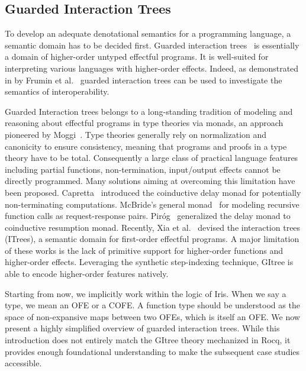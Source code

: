 \documentclass{article}
\theoremstyle{definition}
\theoremstyle{plain}
\theoremstyle{remark}
\begin{document}
\subsection{Guarded Interaction Trees}

To develop an adequate denotational semantics for a programming language, a semantic domain has to be decided first.
Guarded interaction trees~\cite{popl24gitree} is essentially a domain of higher-order untyped effectful programs.
It is well-suited for interpreting various languages with higher-order effects.
Indeed, as demonstrated in by Frumin et al.~\cite{popl24gitree} guarded interaction trees can be used to investigate the semantics of interoperability.\par

Guarded Interaction trees belongs to a long-standing tradition of modeling and reasoning about effectful programs in type theories via monads, an approach pioneered by Moggi~\cite{moggi-monad}.
Type theories generally rely on normalization and canonicity to ensure consistency, meaning that programs and proofs in a type theory have to be total. Consequently a large class of practical language features including partial functions, non-termination, input/output effects cannot be directly programmed. Many solutions aiming at overcoming this limitation have been proposed. Capretta~\cite{delaymonad} introduced the coinductive delay monad for potentially non-terminating computations. McBride's general monad~\cite{generalmonad} for modeling recursive function calls as request-response pairs. Pir\'og~\cite{res-monad} generalized the delay monad to coinductive resumption monad. Recently, Xia et al.~\cite{itrees} devised the interaction trees (ITrees), a semantic domain for first-order effectful programs.
A major limitation of these works is the lack of primitive support for higher-order functions and higher-order effects. Leveraging the synthetic step-indexing technique, GItree is able to encode higher-order features natively.\par

Starting from now, we implicitly work within the logic of Iris. When we say a type, we mean an OFE or a COFE. A function type should be understood as the space of non-expansive maps between two OFEs, which is itself an OFE.
We now present a highly simplified overview of guarded interaction trees. While this introduction does not entirely match the GItree theory mechanized in Rocq, it provides enough foundational understanding to make the subsequent case studies accessible.
\end{document}
